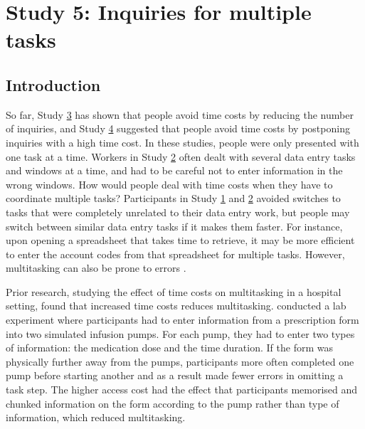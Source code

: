 

\section{Study 5: Inquiries for multiple tasks}\label{st:Study5}
\subsection{Introduction}
So far, Study \hyperref[st:Study3]{3} has shown that people avoid time costs by reducing the number of inquiries, and Study \hyperref[st:Study4]{4} suggested that people avoid time costs by postponing inquiries with a high time cost. In these studies, people were only presented with one task at a time. Workers in Study \hyperref[st:Study2]{2} often dealt with several data entry tasks and windows at a time, and had to be careful not to enter information in the wrong windows. How would people deal with time costs when they have to coordinate multiple tasks? Participants in Study \hyperref[st:Study1]{1} and \hyperref[st:Study2]{2} avoided switches to tasks that were completely unrelated to their data entry work, but people may switch between similar data entry tasks if it makes them faster. For instance, upon opening a spreadsheet that takes time to retrieve, it may be more efficient to enter the account codes from that spreadsheet for multiple tasks. However, multitasking can also be prone to errors \citep{Carrier2015}.

Prior research, studying the effect of time costs on multitasking in a hospital setting, found that increased time costs reduces multitasking. \citet{Back2012} conducted a lab experiment where participants had to enter information from a prescription form into two simulated infusion pumps. For each pump, they had to enter two types of information: the medication dose and the time duration. If the form was physically further away from the pumps, participants more often completed one pump before starting another and as a result made fewer errors in omitting a task step. The higher access cost had the effect that participants memorised and chunked information on the form according to the pump rather than type of information, which reduced multitasking.

